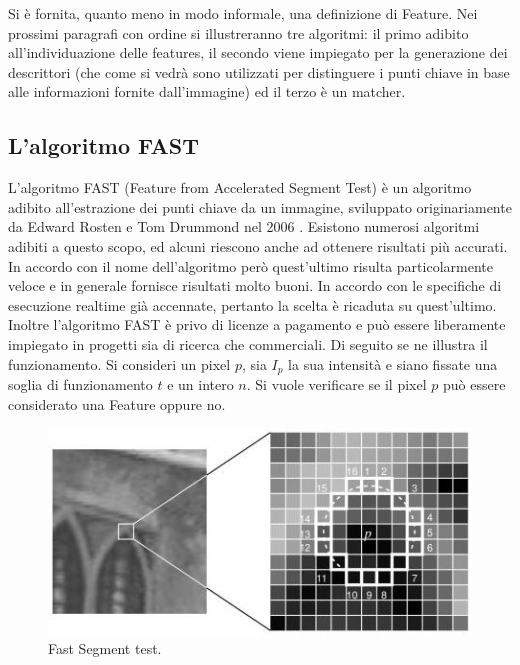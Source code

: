 Si è fornita, quanto meno in modo informale, una definizione di Feature. Nei prossimi paragrafi con ordine si illustreranno tre algoritmi: il primo adibito all'individuazione delle features, il secondo viene impiegato per la generazione dei descrittori (che come si vedrà sono utilizzati per distinguere i punti chiave in base alle informazioni fornite dall'immagine) ed il terzo è un matcher. 

\subsection{L'algoritmo FAST}
\label{sec:det:fast}
L'algoritmo FAST (Feature from Accelerated Segment Test) è un algoritmo adibito all'estrazione dei punti chiave da un immagine, sviluppato originariamente da Edward Rosten e Tom Drummond nel 2006 \cite{bib2}. Esistono numerosi algoritmi adibiti a questo scopo, ed alcuni riescono anche ad ottenere risultati più accurati. In accordo con il nome dell'algoritmo però quest'ultimo risulta particolarmente veloce e in generale fornisce risultati molto buoni. In accordo con le specifiche di esecuzione realtime già accennate, pertanto la scelta è ricaduta su quest'ultimo. Inoltre l'algoritmo FAST è privo di licenze a pagamento e può essere liberamente impiegato in progetti sia di ricerca che commerciali. Di seguito se ne illustra il funzionamento.
\newline \newline
Si consideri un pixel $p$, sia $I_p$ la sua intensità e siano fissate una soglia di funzionamento $t$ e un intero $n$. Si vuole verificare se il pixel $p$ può essere considerato una Feature oppure no. 

\begin{figure}[h]
	\centering
	\includegraphics[width=420pt]{imgs/fast_speedtest.jpg}
	\caption{Fast Segment test.}
	\label{vis:feature:Fast}
\end{figure} 
  
